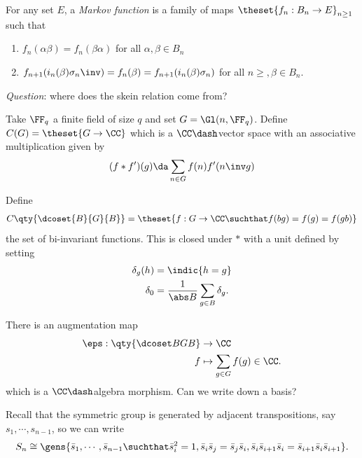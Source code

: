 \begin{definition}[?]

For any set \(E\), a \emph{Markov function} is a family of maps
\(\theset{f_n: B_n \to E}_{n\geq 1}\) such that

\begin{enumerate}
\def\labelenumi{\arabic{enumi}.}
\item
  \(f_n(\alpha \beta) = f_n(\beta\alpha)\) for all
  \(\alpha, \beta\in B_n\)
\item
  \(f_{n+1}(i_n(\beta)\sigma_n\inv) = f_n(\beta) = f_{n+1}(i_n(\beta) \sigma_n)\)
  for all \(n\geq, \beta \in B_n\).
\end{enumerate}

\end{definition}

\emph{Question}: where does the skein relation come from?

Take \(\FF_q\) a finite field of size \(q\) and set
\(G = \Gl(n, \FF_q)\). Define \(C(G) = \theset{G\to \CC}\) which is a
\(\CC\dash\)vector space with an associative multiplication given by
\begin{align*}
(f\ast f')(g) \da \sum_{n\in G} f(n) f'(n\inv g)
\end{align*}

Define
\begin{align*}
C\qty{\dcoset{B}{G}{B}} = \theset{f: G\to \CC \suchthat f(bg) = f(g) = f(gb)}
\end{align*} the set of bi-invariant functions. This is closed under
\(\ast\) with a unit defined by setting
\begin{align*}  
\delta_g(h) &= \indic{h=g} \\
\delta_0 &= {1\over \abs B} \sum_{g\in B} \delta_g
.\end{align*}

There is an augmentation map
\begin{align*}  
\eps: \qty{\dcoset B G B} &\to \CC \\
f &\mapsto  \sum_{g\in G} f(g) \in \CC
.\end{align*} which is a \(\CC\dash\)algebra morphism. Can we write down
a basis?

Recall that the symmetric group is generated by adjacent transpositions,
say \(s_1, \cdots, s_{n-1}\), so we can write
\begin{align*}
S_n \cong \gens{\bar s_1, \cdots, \bar s_{n-1} \suchthat \bar s_i^2 = 1, \bar s_i \bar s_j = \bar s_j \bar s_i, \bar s_i \bar s_{i+1} \bar s_i = \bar s_{i+1} \bar s_i \bar s_{i+1} }
.\end{align*}

